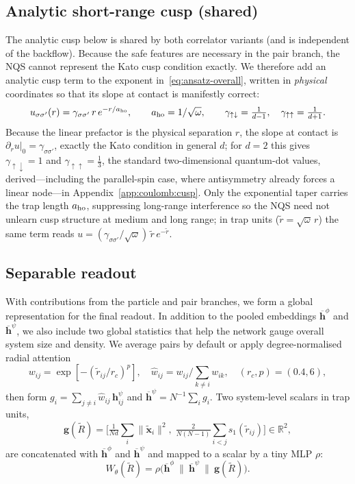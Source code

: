 \subsection{Analytic short-range cusp (shared)}
\label{subsec:cusp-implementation}
The analytic cusp below is shared by both correlator variants (and is independent of the
backflow). Because the safe features are necessary in the pair branch, the NQS cannot represent the Kato cusp condition exactly.
We therefore add an analytic cusp term to the exponent in~\eqref{eq:ansatz-overall},
written in \emph{physical} coordinates so that its slope at contact is manifestly
correct:
\begin{equation}
  u_{\sigma\sigma'}(r)
  =
  \gamma_{\sigma\sigma'}\, r\, e^{-r/a_{\rm ho}},
  \qquad a_{\rm ho}=1/\sqrt{\omega},
  \qquad
  \gamma_{\uparrow\downarrow}=\tfrac{1}{d-1},\quad
  \gamma_{\uparrow\uparrow}=\tfrac{1}{d+1}.
  \label{eq:cusp}
\end{equation}
Because the linear prefactor is the physical separation $r$, the slope at contact is
$\partial_r u|_{0}=\gamma_{\sigma\sigma'}$, exactly the Kato condition in general $d$;
for $d=2$ this gives $\gamma_{\uparrow\downarrow}=1$ and $\gamma_{\uparrow\uparrow}=\tfrac13$,
the standard two-dimensional quantum-dot values, derived---including the parallel-spin
case, where antisymmetry already forces a linear node---in
Appendix~\ref{app:coulomb:cusp}. Only the exponential taper carries the trap length
$a_{\rm ho}$, suppressing long-range interference so the NQS need not unlearn cusp
structure at medium and long range; in trap units ($\tilde r=\sqrt{\omega}\,r$) the same
term reads $u=(\gamma_{\sigma\sigma'}/\sqrt{\omega})\,\tilde r\,e^{-\tilde r}$.


\subsection{Separable readout}
With contributions from the particle and pair branches, we form a global representation for the final readout. In addition to the pooled embeddings $\overline{\mathbf h}^\phi$ and $\overline{\mathbf h}^\psi$, we also include two global statistics that help the network gauge overall system size and density.
We average pairs by default or apply degree-normalised radial attention
\[
  w_{ij}=\exp[-(\tilde r_{ij}/r_c)^p],\quad
  \hat w_{ij}=w_{ij}\Big/\sum_{k\ne i}w_{ik},\quad
  (r_c,p)=(0.4,6),
\]
then form $g_i=\sum_{j\ne i}\hat w_{ij}\,\mathbf h^\psi_{ij}$ and $\overline{\mathbf h}^\psi=N^{-1}\sum_i g_i$.
Two system-level scalars in trap units,
\[
  \mathbf g(\tilde{R})=
  \Big[\tfrac{1}{Nd}\sum_i\|\tilde{\mathbf x}_i\|^2,\;
       \tfrac{2}{N(N-1)}\sum_{i<j}s_1(\tilde r_{ij})\Big]\in\mathbb R^2,
\]
are concatenated with $\overline{\mathbf h}^{\phi}$ and $\overline{\mathbf h}^{\psi}$ and mapped to a scalar by a tiny MLP $\rho$:
\begin{equation}
  W_\theta(\tilde{R})
  =
  \rho\!\Big(\overline{\mathbf h}^{\phi}\ \|\ \overline{\mathbf h}^{\psi}\ \|\ \mathbf g(\tilde{R})\Big).
  \label{eq:nqs-readout}
\end{equation}

